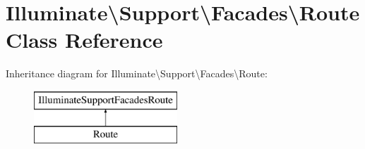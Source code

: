 \hypertarget{class_illuminate_1_1_support_1_1_facades_1_1_route}{}\section{Illuminate\textbackslash{}Support\textbackslash{}Facades\textbackslash{}Route Class Reference}
\label{class_illuminate_1_1_support_1_1_facades_1_1_route}
Inheritance diagram for Illuminate\textbackslash{}Support\textbackslash{}Facades\textbackslash{}Route\+:\begin{figure}[H]
\begin{center}
\leavevmode
\includegraphics[height=2.000000cm]{class_illuminate_1_1_support_1_1_facades_1_1_route}
\end{center}
\end{figure}
